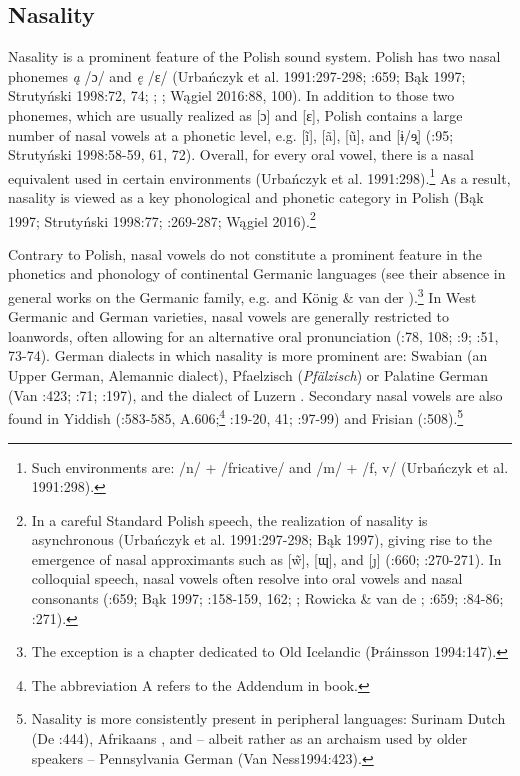 \documentclass[output=paper]{langscibook}
\begin{document}
\subsection{Nasality}\label{sec:wymsorys:4.3}

Nasality is a prominent feature of the Polish sound system. Polish has two nasal phonemes \textit{ą} /ɔ/ and \textit{ę} /ɛ/ (Urbańczyk et al. 1991:297-298; \citealt{Rothstein1993}:659; Bąk 1997; Strutyński 1998:72, 74; \citealt{Bloch-Rozmej1997}; \citealt{Gussmann2007}; Wągiel 2016:88, 100). In addition to those two phonemes, which are usually realized as [ɔ] and [ɛ], Polish contains a large number of nasal vowels at a phonetic level, e.g. [ĩ], [ã], [ũ], and [ɨ/ɘ̟] (\citealt{Bloch-Rozmej1997}:95; Strutyński 1998:58-59, 61, 72). Overall, for every oral vowel, there is a nasal equivalent used in certain environments (Urbańczyk et al. 1991:298).\footnote{Such environments are: /n/ + /fricative/ and /m/ + /f, v/ (Urbańczyk et al. 1991:298).} As a result, nasality is viewed as a key phonological and phonetic category in Polish (Bąk 1997; Strutyński 1998:77; \citealt{Gussmann2007}:269-287; Wągiel 2016).\footnote{In a careful Standard Polish speech, the realization of nasality is asynchronous (Urbańczyk et al. 1991:297-298; Bąk 1997), giving rise to the emergence of nasal approximants such as [\~{w}], [ɰ], and [ȷ] (\citealt{Rothstein1993}:660; \citealt{Gussmann2007}:270-271). In colloquial speech, nasal vowels often resolve into oral vowels and nasal consonants (\citealt{Rothstein1993}:659; Bąk 1997; \citealt{SussexCubberley2006}:158-159, 162; \citealt{Rubach1977}; Rowicka \& van de \citealt{Weijer1992}; \citealt{Rothstein1993}:659; \citealt{Bloch-Rozmej1997}:84-86; \citealt{Gussmann2007}:271).}

Contrary to Polish, nasal vowels do not constitute a prominent feature in the phonetics and phonology of continental Germanic languages (see their absence in general works on the Germanic family, e.g. \citealt{Harbert2007} and König \& van der \citealt{Auwera1994}).\footnote{The exception is a chapter dedicated to Old Icelandic (Þráinsson 1994:147).} In West Germanic and German varieties, nasal vowels are generally restricted to loanwords, often allowing for an alternative oral pronunciation (\citealt{Russ1994}:78, 108; \citealt{Fagan2009}:9; \citealt{Caratini2009}:51, 73-74). German dialects in which nasality is more prominent are: Swabian (an Upper German, Alemannic dialect), Pfaelzisch (\textit{Pfälzisch}) or Palatine German (Van \citealt{Ness1994}:423; \citealt{Stevenson1997}:71; \citealt{NiebaumMacha1999}:197), and the dialect of Luzern \citep[179]{Bacher1905}. Secondary nasal vowels are also found in Yiddish (\citealt{Weinreich2008}:583-585, A.606;\footnote{The abbreviation A refers to the Addendum in  book.} \citealt{HerzogEtAl1992}:19-20, 41; \citealt{Jacobs2005}:97-99) and Frisian (\citealt{HoekstraTierstna1994}:508).\footnote{Nasality is more consistently present in peripheral languages: Surinam Dutch (De \citealt{Schutter1994}:444), Afrikaans \citep[481]{Donaldson1994}, and – albeit rather as an archaism used by older speakers – Pennsylvania German (Van Ness1994:423).} 
\end{document}
